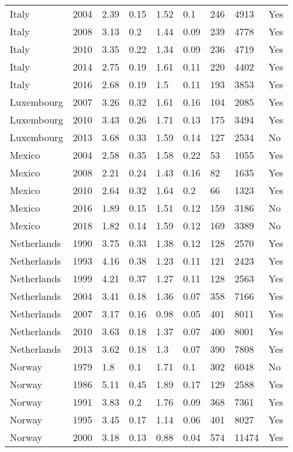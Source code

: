 \begin{tabular}{lllllllll}
Italy & 2004 & 2.39 & 0.15 & 1.52 & 0.1 & 246 & 4913 & Yes \\ 
Italy & 2008 & 3.13 & 0.2 & 1.44 & 0.09 & 239 & 4778 & Yes \\ 
Italy & 2010 & 3.35 & 0.22 & 1.34 & 0.09 & 236 & 4719 & Yes \\ 
Italy & 2014 & 2.75 & 0.19 & 1.61 & 0.11 & 220 & 4402 & Yes \\ 
Italy & 2016 & 2.68 & 0.19 & 1.5 & 0.11 & 193 & 3853 & Yes \\ 
Luxembourg & 2007 & 3.26 & 0.32 & 1.61 & 0.16 & 104 & 2085 & Yes \\ 
Luxembourg & 2010 & 3.43 & 0.26 & 1.71 & 0.13 & 175 & 3494 & Yes \\ 
Luxembourg & 2013 & 3.68 & 0.33 & 1.59 & 0.14 & 127 & 2534 & No \\ 
Mexico & 2004 & 2.58 & 0.35 & 1.58 & 0.22 & 53 & 1055 & Yes \\ 
Mexico & 2008 & 2.21 & 0.24 & 1.43 & 0.16 & 82 & 1635 & Yes \\ 
Mexico & 2010 & 2.64 & 0.32 & 1.64 & 0.2 & 66 & 1323 & Yes \\ 
Mexico & 2016 & 1.89 & 0.15 & 1.51 & 0.12 & 159 & 3186 & No \\ 
Mexico & 2018 & 1.82 & 0.14 & 1.59 & 0.12 & 169 & 3389 & No \\ 
Netherlands & 1990 & 3.75 & 0.33 & 1.38 & 0.12 & 128 & 2570 & Yes \\ 
Netherlands & 1993 & 4.16 & 0.38 & 1.23 & 0.11 & 121 & 2423 & Yes \\ 
Netherlands & 1999 & 4.21 & 0.37 & 1.27 & 0.11 & 128 & 2563 & Yes \\ 
Netherlands & 2004 & 3.41 & 0.18 & 1.36 & 0.07 & 358 & 7166 & Yes \\ 
Netherlands & 2007 & 3.17 & 0.16 & 0.98 & 0.05 & 401 & 8011 & Yes \\ 
Netherlands & 2010 & 3.63 & 0.18 & 1.37 & 0.07 & 400 & 8001 & Yes \\ 
Netherlands & 2013 & 3.62 & 0.18 & 1.3 & 0.07 & 390 & 7808 & Yes \\ 
Norway & 1979 & 1.8 & 0.1 & 1.71 & 0.1 & 302 & 6048 & No \\ 
Norway & 1986 & 5.11 & 0.45 & 1.89 & 0.17 & 129 & 2588 & Yes \\ 
Norway & 1991 & 3.83 & 0.2 & 1.76 & 0.09 & 368 & 7361 & Yes \\ 
Norway & 1995 & 3.45 & 0.17 & 1.14 & 0.06 & 401 & 8027 & Yes \\ 
Norway & 2000 & 3.18 & 0.13 & 0.88 & 0.04 & 574 & 11474 & Yes \\ 

\end{tabular}
